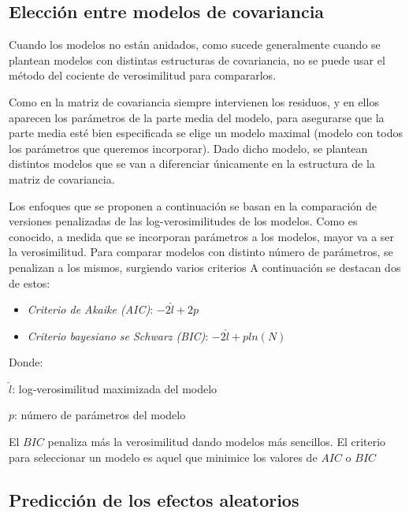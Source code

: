 \documentclass[12pt]{article}
\begin{document}

\subsection{Elección entre modelos de covariancia}

Cuando los modelos no están anidados, como sucede generalmente cuando se plantean modelos con distintas estructuras
de covariancia, no se puede usar el método del cociente de verosimilitud para compararlos.

Como en la matriz de covariancia siempre intervienen los residuos, y en ellos aparecen los parámetros de la parte
media del modelo, para asegurarse que la parte media esté bien especificada se elige un modelo maximal (modelo con
todos los parámetros que queremos incorporar). Dado dicho modelo, se plantean distintos modelos que se van a diferenciar
únicamente en la estructura de la matriz de covariancia.

Los enfoques que se proponen a continuación se basan en la comparación de versiones penalizadas de las log-verosimilitudes
de los modelos. Como es conocido, a medida que se incorporan parámetros a los modelos, mayor va a ser la verosimilitud.
Para comparar modelos con distinto número de parámetros, se penalizan a los mismos, surgiendo varios criterios A
continuación se destacan dos de estos:

\begin{itemize}
	\item \emph{Criterio de Akaike (AIC)}: $-2\hat{l} + 2p$
	\item \emph{Criterio bayesiano se Schwarz (BIC)}: $-2\hat{l} + p ln(N)$
\end{itemize}

Donde:

$\hat{l}$: log-verosimilitud maximizada del modelo

$p$: número de parámetros del modelo

El $BIC$ penaliza más la verosimilitud dando modelos más sencillos. El criterio para seleccionar un modelo es aquel que
minimice los valores de $AIC$ o $BIC$


\subsection{Predicción de los efectos aleatorios}
\end{document}
